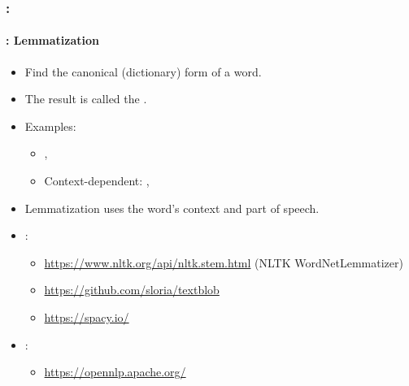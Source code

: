 \documentclass[xcolor=table]{beamer}
\begin{document}
\begin{frame}
	\frametitle{\insertshortsubtitle: \insertsection}
	\framesubtitle{\insertsubsection: Lemmatization}
	
	\begin{itemize}
		\item Find the canonical (dictionary) form of a word.
		\item The result is called the .
		\item Examples:
		\begin{itemize}
			\item {}, 
			\item Context-dependent: , 
		\end{itemize}
		\item Lemmatization uses the word's context and part of speech.
		\item {}:
		\begin{itemize}
			\item \url{https://www.nltk.org/api/nltk.stem.html} (NLTK WordNetLemmatizer)
			\item \url{https://github.com/sloria/textblob}
			\item \url{https://spacy.io/}
		\end{itemize}
		\item {}:
		\begin{itemize}
			\item \url{https://opennlp.apache.org/}
		\end{itemize}
	\end{itemize}

\end{frame}
\end{document}
